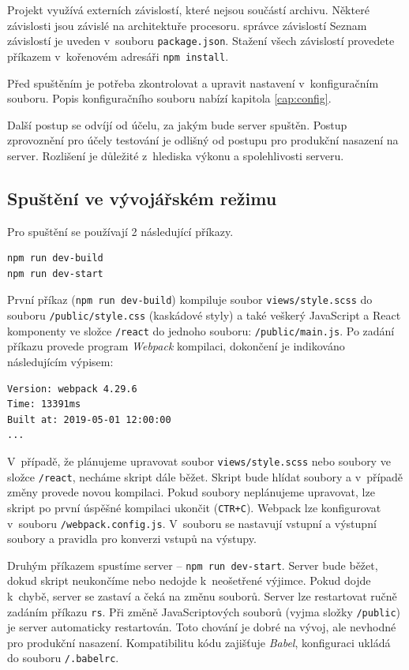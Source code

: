Projekt využívá externích závislostí, které nejsou součástí archivu. Některé závislosti jsou závislé na architektuře procesoru. správce závislostí  Seznam závislostí je uveden v~souboru \texttt{package.json}. Stažení všech závislostí provedete příkazem v~kořenovém adresáři \texttt{npm install}.

Před spuštěním je potřeba zkontrolovat a upravit nastavení v~konfiguračním souboru. Popis konfiguračního souboru nabízí kapitola \ref{cap:config}.

Další postup se odvíjí od účelu, za jakým bude server spuštěn. Postup zprovoznění pro účely testování je odlišný od postupu pro produkční nasazení na server. Rozlišení je důležité z~hlediska výkonu a spolehlivosti serveru.

\subsection{Spuštění ve vývojářském režimu}
Pro spuštění se používají 2 následující příkazy.
\begin{lstlisting}[style=bash]
npm run dev-build
npm run dev-start
\end{lstlisting}
První příkaz (\texttt{npm run dev-build}) kompiluje soubor \texttt{views/style.scss} do souboru \texttt{/public/style.css} (kaskádové styly) a také veškerý JavaScript a React komponenty ve složce \texttt{/react} do jednoho souboru: \texttt{/public/main.js}. Po zadání příkazu provede program \textit{Webpack} kompilaci, dokončení je indikováno následujícím výpisem:
\begin{lstlisting}
Version: webpack 4.29.6
Time: 13391ms
Built at: 2019-05-01 12:00:00
...
\end{lstlisting}

V~případě, že plánujeme upravovat soubor \texttt{views/style.scss} nebo soubory ve složce \texttt{/react}, necháme skript dále běžet. Skript bude hlídat soubory a v~případě změny provede novou kompilaci. Pokud soubory neplánujeme upravovat, lze skript po první úspěšné kompilaci ukončit (\texttt{CTR+C}). Webpack lze konfigurovat v~souboru \texttt{/webpack.config.js}. V~souboru se nastavují vstupní a výstupní soubory a pravidla pro konverzi vstupů na výstupy.

Druhým příkazem spustíme server -- \texttt{npm run dev-start}. Server bude běžet, dokud skript neukončíme nebo nedojde k~neošetřené výjimce. Pokud dojde k~chybě, server se zastaví a čeká na změnu souborů. Server lze restartovat ručně zadáním příkazu \texttt{rs}. Při změně JavaScriptových souborů (vyjma složky \texttt{/public}) je server automaticky restartován. Toto chování je dobré na vývoj, ale nevhodné pro produkční nasazení. Kompatibilitu kódu zajišťuje \textit{Babel}, konfiguraci ukládá do souboru \texttt{/.babelrc}.

